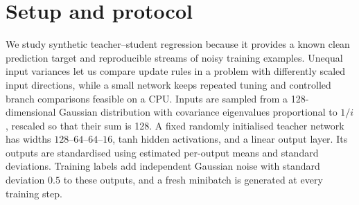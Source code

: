 \documentclass[11pt,a4paper]{article}
\begin{document}
\section{Setup and protocol}\label{sec:setup}
We study synthetic teacher--student regression because it provides a known clean prediction target and reproducible streams of noisy training examples. Unequal input variances let us compare update rules in a problem with differently scaled input directions, while a small network keeps repeated tuning and controlled branch comparisons feasible on a CPU. Inputs are sampled from a 128-dimensional Gaussian distribution with covariance eigenvalues proportional to $1/i$, rescaled so that their sum is 128. A fixed randomly initialised teacher network has widths $128$--$64$--$64$--$16$, tanh hidden activations, and a linear output layer. Its outputs are standardised using estimated per-output means and standard deviations. Training labels add independent Gaussian noise with standard deviation $0.5$ to these outputs, and a fresh minibatch is generated at every training step.
\end{document}
